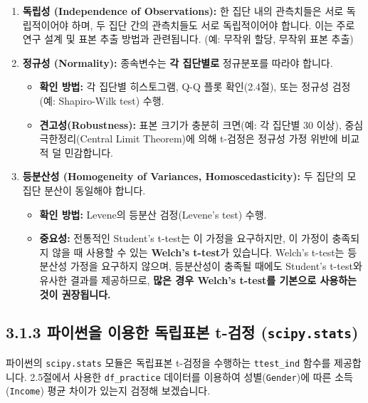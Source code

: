 \documentclass[
  letterpaper,
]{book}
\providecommand{\tightlist}{%
  \setlength{\itemsep}{0pt}\setlength{\parskip}{0pt}}
\begin{document}
\begin{enumerate}
\def\labelenumi{\arabic{enumi}.}
\tightlist
\item
  \textbf{독립성 (Independence of Observations):} 한 집단 내의
  관측치들은 서로 독립적이어야 하며, 두 집단 간의 관측치들도 서로
  독립적이어야 합니다. 이는 주로 연구 설계 및 표본 추출 방법과
  관련됩니다. (예: 무작위 할당, 무작위 표본 추출)
\item
  \textbf{정규성 (Normality):} 종속변수는 \textbf{각 집단별로}
  정규분포를 따라야 합니다.

  \begin{itemize}
  \tightlist
  \item
    \textbf{확인 방법:} 각 집단별 히스토그램, Q-Q 플롯 확인(2.4절), 또는
    정규성 검정(예: Shapiro-Wilk test) 수행.
  \item
    \textbf{견고성(Robustness):} 표본 크기가 충분히 크면(예: 각 집단별
    30 이상), 중심극한정리(Central Limit Theorem)에 의해 t-검정은 정규성
    가정 위반에 비교적 덜 민감합니다.
  \end{itemize}
\item
  \textbf{등분산성 (Homogeneity of Variances, Homoscedasticity):} 두
  집단의 모집단 분산이 동일해야 합니다.

  \begin{itemize}
  \tightlist
  \item
    \textbf{확인 방법:} Levene의 등분산 검정(Levene's test) 수행.
  \item
    \textbf{중요성:} 전통적인 Student's t-test는 이 가정을 요구하지만,
    이 가정이 충족되지 않을 때 사용할 수 있는 \textbf{Welch's t-test}가
    있습니다. Welch's t-test는 등분산성 가정을 요구하지 않으며,
    등분산성이 충족될 때에도 Student's t-test와 유사한 결과를
    제공하므로, \textbf{많은 경우 Welch's t-test를 기본으로 사용하는
    것이 권장됩니다.}
  \end{itemize}
\end{enumerate}

\subsection{\texorpdfstring{3.1.3 파이썬을 이용한 독립표본 t-검정
(\texttt{scipy.stats})}{3.1.3 파이썬을 이용한 독립표본 t-검정 (scipy.stats)}}\label{uxd30cuxc774uxc36cuxc744-uxc774uxc6a9uxd55c-uxb3c5uxb9bduxd45cuxbcf8-t-uxac80uxc815-scipy.stats}

파이썬의 \texttt{scipy.stats} 모듈은 독립표본 t-검정을 수행하는
\texttt{ttest\_ind} 함수를 제공합니다. 2.5절에서 사용한
\texttt{df\_practice} 데이터를 이용하여 성별(\texttt{Gender})에 따른
소득(\texttt{Income}) 평균 차이가 있는지 검정해 보겠습니다.
\end{document}
